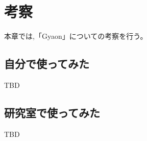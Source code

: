 \chapter{考察}
\label{chap:discussion}

本章では,「Gyaon」についての考察を行う。

\newpage

\section{自分で使ってみた}

TBD

\section{研究室で使ってみた}

TBD
